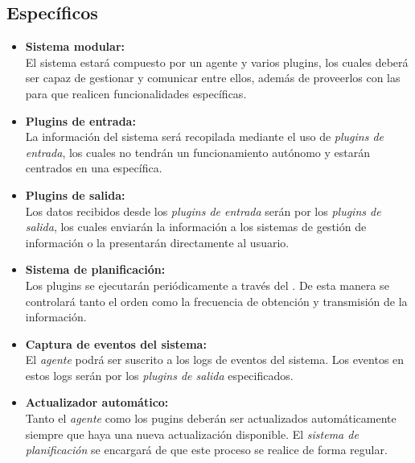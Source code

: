     \subsection{Específicos}
        \begin{itemize}
            \item \textbf{Sistema modular:} \\
                El sistema estará compuesto por un agente y varios plugins, los cuales deberá ser capaz de gestionar y comunicar entre ellos, además de proveerlos con las  para que realicen funcionalidades específicas.
                
            \item \textbf{Plugins de entrada:} \\
                La información del sistema será recopilada mediante el uso de \textit{plugins de entrada}, los cuales no tendrán un funcionamiento autónomo y estarán centrados en una  específica.
                
            \item \textbf{Plugins de salida:} \\
                Los datos recibidos desde los \textit{plugins de entrada} serán  por los \textit{plugins de salida}, los cuales enviarán la información a los sistemas de gestión de información  o la presentarán directamente al usuario.
                
            \item \textbf{Sistema de planificación:} \\
                Los plugins se ejecutarán periódicamente a través del \textit{}. De esta manera se controlará tanto el orden como la frecuencia de obtención y transmisión de la información.
                
            \item \textbf{Captura de eventos del sistema:} \\
                El \textit{agente} podrá ser suscrito a los logs de eventos del sistema. Los eventos  en estos logs serán  por los \textit{plugins de salida} especificados.
            
            \item \textbf{Actualizador automático:} \\
                Tanto el \textit{agente} como los pugins deberán ser actualizados automáticamente siempre que haya una nueva actualización disponible. El \textit{sistema de planificación} se encargará de que este proceso se realice de forma regular.
                

\end{itemize}
